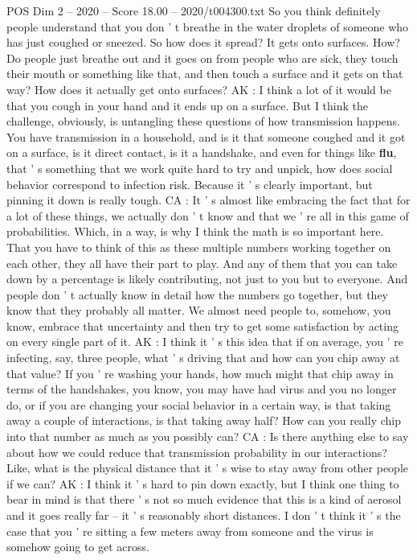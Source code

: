 \begin{textsample}{POS Dim 2 – 2020 – Score 18.00 – 2020/t004300.txt}
So you think definitely people understand that you don ' t breathe in the water droplets of someone who has just coughed or sneezed.
So how does it spread?
It gets onto surfaces.
How?
Do people just breathe out and it goes on from people who are sick, they touch their mouth or something like that, and then touch a surface and it gets on that way?
How does it actually get onto surfaces?
AK : I think a lot of it would be that you cough in your hand and it ends up on a surface.
But I think the challenge, obviously, is untangling these questions of how transmission happens.
You have transmission in a household, and is it that someone coughed and it got on a surface, is it direct contact, is it a handshake, and even for things like \textbf{flu}, that ' s something that we work quite hard to try and unpick, how does social behavior correspond to infection risk.
Because it ' s clearly important, but pinning it down is really tough.
CA : It ' s almost like embracing the fact that for a lot of these things, we actually don ' t know and that we ' re all in this game of probabilities.
Which, in a way, is why I think the math is so important here.
That you have to think of this as these multiple numbers working together on each other, they all have their part to play.
And any of them that you can take down by a percentage is likely contributing, not just to you but to everyone.
And people don ' t actually know in detail how the numbers go together, but they know that they probably all matter.
We almost need people to, somehow, you know, embrace that uncertainty and then try to get some satisfaction by acting on every single part of it.
AK : I think it ' s this idea that if on average, you ' re infecting, say, three people, what ' s driving that and how can you chip away at that value?
If you ' re washing your hands, how much might that chip away in terms of the handshakes, you know, you may have had virus and you no longer do, or if you are changing your social behavior in a certain way, is that taking away a couple of interactions, is that taking away half?
How can you really chip into that number as much as you possibly can?
CA : Is there anything else to say about how we could reduce that transmission probability in our interactions?
Like, what is the physical distance that it ' s wise to stay away from other people if we can?
AK : I think it ' s hard to pin down exactly, but I think one thing to bear in mind is that there ' s not so much evidence that this is a kind of aerosol and it goes really far -- it ' s reasonably short distances.
I don ' t think it ' s the case that you ' re sitting a few meters away from someone and the virus is somehow going to get across.

\end{textsample}
